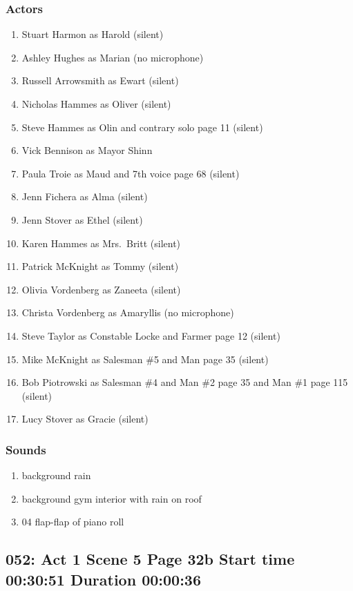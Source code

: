 \subsubsection{Actors}
\begin{enumerate}
\item Stuart Harmon as Harold (silent)
\item Ashley Hughes as Marian (no microphone)
\item Russell Arrowsmith as Ewart (silent)
\item Nicholas Hammes as Oliver (silent)
\item Steve Hammes as Olin and contrary solo page 11 (silent)
\item Vick Bennison as Mayor Shinn
\item Paula Troie as Maud and 7th voice page 68 (silent)
\item Jenn Fichera as Alma (silent)
\item Jenn Stover as Ethel (silent)
\item Karen Hammes as Mrs.~Britt (silent)
\item Patrick McKnight as Tommy (silent)
\item Olivia Vordenberg as Zaneeta (silent)
\item Christa Vordenberg as Amaryllis (no microphone)
\item Steve Taylor as Constable Locke and Farmer page 12 (silent)
\item Mike McKnight as Salesman \#5 and Man page 35 (silent)
\item Bob Piotrowski as Salesman \#4 and Man \#2 page 35 and Man \#1 page 115 (silent)
\item Lucy Stover as Gracie (silent)
\end{enumerate}

\subsubsection{Sounds}
\begin{enumerate}
\item background rain
\item background gym interior with rain on roof
\item 04 flap-flap of piano roll
\end{enumerate}
\subsection{052: Act 1 Scene 5 Page 32b Start time 00:30:51 Duration 00:00:36}

